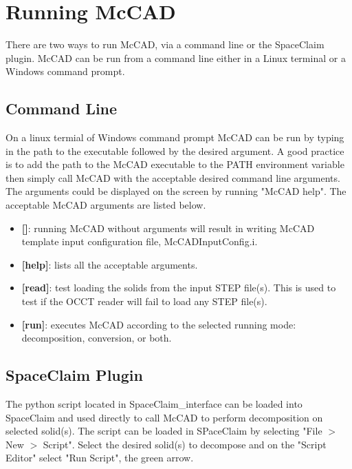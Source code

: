 \documentclass[letterpaper, 12 pt]{report}
\begin{document}
\section{Running McCAD}
There are two ways to run McCAD, via a command line or the SpaceClaim plugin. McCAD can be run from a command line either in a Linux terminal or a Windows command prompt.

  \subsection{Command Line}
    On a linux termial of Windows command prompt McCAD can be run by typing in the path to the executable followed by the desired argument. A good practice is to add the path to the McCAD executable to the PATH environment variable then simply call McCAD with the acceptable desired command line arguments. The arguments could be displayed on the screen by running "McCAD help". The acceptable McCAD arguments are listed below.
    \begin{itemize}
    	\item \textbf{[]}: running McCAD without arguments will result in writing McCAD template input configuration file, McCADInputConfig.i.
    	\item \textbf{[help]}: lists all the acceptable arguments.
    	\item \textbf{[read]}: test loading the solids from the input STEP file(s). This is used to test if the OCCT reader will fail to load any STEP file(s).
    	\item \textbf{[run]}: executes McCAD according to the selected running mode: decomposition, conversion, or both. 
    \end{itemize}

  \subsection{SpaceClaim Plugin}
    The python script located in SpaceClaim\_interface can be loaded into SpaceClaim and used directly to call McCAD to perform decomposition on selected solid(s).  The script can be loaded in SPaceClaim by selecting "File $>$ New $>$ Script". Select the desired solid(s) to decompose and on the "Script Editor" select "Run Script", the green arrow.

\end{document}
